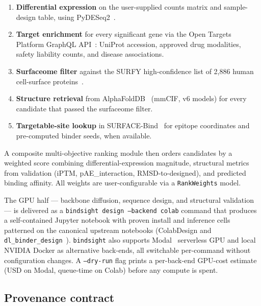 \documentclass[11pt,letterpaper]{article}
\begin{document}
\begin{enumerate}
  \item \textbf{Differential expression} on the user-supplied counts matrix
        and sample-design table, using PyDESeq2~\cite{Muzellec2023}.
  \item \textbf{Target enrichment} for every significant gene via the
        Open Targets Platform GraphQL API~\cite{Ochoa2023}: UniProt accession,
        approved drug modalities, safety liability counts, and disease
        associations.
  \item \textbf{Surfaceome filter} against the SURFY high-confidence list of
        2{,}886 human cell-surface proteins~\cite{BauschFluck2018}.
  \item \textbf{Structure retrieval} from AlphaFoldDB~\cite{Varadi2024} (mmCIF,
        v6 models) for every candidate that passed the surfaceome filter.
  \item \textbf{Targetable-site lookup} in SURFACE-Bind~\cite{Balbi2026} for
        epitope coordinates and pre-computed binder seeds, when available.
\end{enumerate}

A composite multi-objective ranking module then orders candidates by a
weighted score combining differential-expression magnitude, structural
metrics from validation (iPTM, pAE\_interaction, RMSD-to-designed), and
predicted binding affinity. All weights are user-configurable via a
\texttt{RankWeights} model.

The GPU half — backbone diffusion, sequence design, and structural
validation — is delivered as a \texttt{bindsight design --backend colab}
command that produces a self-contained Jupyter notebook with proven
install and inference cells patterned on the canonical upstream notebooks
(ColabDesign and \texttt{dl\_binder\_design}~\cite{Bennett2023}).
\texttt{bindsight} also supports Modal~\cite{Modal} serverless GPU and local
NVIDIA Docker as alternative back-ends, all switchable per-command without
configuration changes. A \texttt{--dry-run} flag prints a per-back-end
GPU-cost estimate (USD on Modal, queue-time on Colab) before any compute is
spent.

\subsection{Provenance contract}
\end{document}

